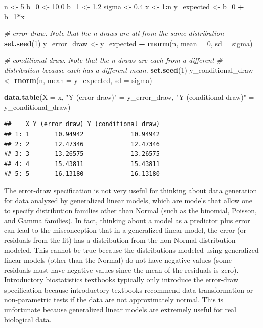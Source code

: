 \documentclass[]{book}
\newenvironment{Shaded}{\begin{snugshade}}{\end{snugshade}}
\newcommand{\CommentTok}[1]{\textcolor[rgb]{0.56,0.35,0.01}{\textit{#1}}}
\newcommand{\DataTypeTok}[1]{\textcolor[rgb]{0.13,0.29,0.53}{#1}}
\newcommand{\DecValTok}[1]{\textcolor[rgb]{0.00,0.00,0.81}{#1}}
\newcommand{\FloatTok}[1]{\textcolor[rgb]{0.00,0.00,0.81}{#1}}
\newcommand{\KeywordTok}[1]{\textcolor[rgb]{0.13,0.29,0.53}{\textbf{#1}}}
\newcommand{\NormalTok}[1]{#1}
\newcommand{\OperatorTok}[1]{\textcolor[rgb]{0.81,0.36,0.00}{\textbf{#1}}}
\newcommand{\StringTok}[1]{\textcolor[rgb]{0.31,0.60,0.02}{#1}}
\begin{document}
\begin{Shaded}
\begin{Highlighting}[]
\NormalTok{n <-}\StringTok{ }\DecValTok{5}
\NormalTok{b_}\DecValTok{0}\NormalTok{ <-}\StringTok{ }\FloatTok{10.0}
\NormalTok{b_}\DecValTok{1}\NormalTok{ <-}\StringTok{ }\FloatTok{1.2}
\NormalTok{sigma <-}\StringTok{ }\FloatTok{0.4}
\NormalTok{x <-}\StringTok{ }\DecValTok{1}\OperatorTok{:}\NormalTok{n}
\NormalTok{y_expected <-}\StringTok{ }\NormalTok{b_}\DecValTok{0} \OperatorTok{+}\StringTok{ }\NormalTok{b_}\DecValTok{1}\OperatorTok{*}\NormalTok{x}

\CommentTok{# error-draw. Note that the n draws are all from the same distribution}
\KeywordTok{set.seed}\NormalTok{(}\DecValTok{1}\NormalTok{)}
\NormalTok{y_error_draw <-}\StringTok{ }\NormalTok{y_expected }\OperatorTok{+}\StringTok{ }\KeywordTok{rnorm}\NormalTok{(n, }\DataTypeTok{mean =} \DecValTok{0}\NormalTok{, }\DataTypeTok{sd =}\NormalTok{ sigma)}

\CommentTok{# conditional-draw. Note that the n draws are each from a different}
\CommentTok{# distribution because each has a different mean.}
\KeywordTok{set.seed}\NormalTok{(}\DecValTok{1}\NormalTok{)}
\NormalTok{y_conditional_draw <-}\StringTok{ }\KeywordTok{rnorm}\NormalTok{(n, }\DataTypeTok{mean =}\NormalTok{ y_expected, }\DataTypeTok{sd =}\NormalTok{ sigma)}

\KeywordTok{data.table}\NormalTok{(}\DataTypeTok{X =}\NormalTok{ x,}
           \StringTok{"Y (error draw)"}\NormalTok{ =}\StringTok{ }\NormalTok{y_error_draw,}
           \StringTok{"Y (conditional draw)"}\NormalTok{ =}\StringTok{ }\NormalTok{y_conditional_draw)}
\end{Highlighting}
\end{Shaded}

\begin{verbatim}
##    X Y (error draw) Y (conditional draw)
## 1: 1       10.94942             10.94942
## 2: 2       12.47346             12.47346
## 3: 3       13.26575             13.26575
## 4: 4       15.43811             15.43811
## 5: 5       16.13180             16.13180
\end{verbatim}

The error-draw specification is not very useful for thinking about data generation for data analyzed by generalized linear models, which are models that allow one to specify distribution families other than Normal (such as the binomial, Poisson, and Gamma families). In fact, thinking about a model as a predictor plus error can lead to the misconception that in a generalized linear model, the error (or residuals from the fit) has a distribution from the non-Normal distribution modeled. This cannot be true because the distributions modeled using generalized linear models (other than the Normal) do not have negative values (some residuals must have negative values since the mean of the residuals is zero). Introductory biostatistics textbooks typically only introduce the error-draw specification because introductory textbooks recommend data transformation or non-parametric tests if the data are not approximately normal. This is unfortunate because generalized linear models are extremely useful for real biological data.
\end{document}
